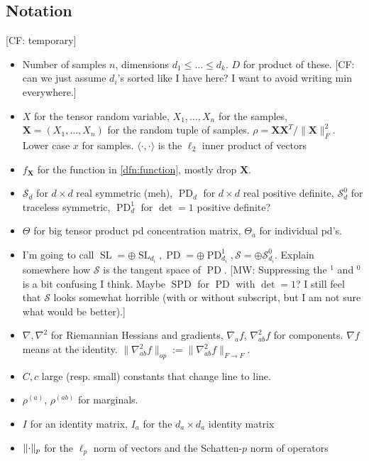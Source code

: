 \documentclass{article}
\DeclarePairedDelimiter{\norm}{\lVert}{\rVert}
\renewcommand{\vec}{\bm}
\newcommand\SL{\operatorname{SL}}
\newcommand\PD{\operatorname{PD}}
\newcommand\Sym{\mathcal{S}}
\newcommand{\CF}[1]{{\color{purple}[CF: #1]}}
\newcommand{\MW}[1]{{\color{red}[MW: #1]}}
\begin{document}
\subsection{Notation}
\CF{temporary}
\begin{itemize}
\item Number of samples $n$, dimensions $d_1\leq \dots \leq d_k$. $D$ for product of these. \CF{can we just assume $d_i$'s sorted like I have here? I want to avoid writing min everywhere.}
\item $X$ for the tensor random variable, $X_1, \dots, X_n$ for the samples, $\vec X = (X_1, \dots, X_n)$ for the random tuple of samples.
$\rho = \vec X \vec X^T/\|\vec X\|_F^2$. Lower case $x$ for samples.
$\langle \cdot, \cdot \rangle$ is the $\ell_2$ inner product of vectors
\item $f_{\vec X}$ for the function in \cref{dfn:function}, mostly drop $\vec X$.
\item $\Sym_d$ for $d \times d$ real symmetric (meh), $\PD_d$ for $d \times d$ real positive definite, $\Sym_d^0$ for traceless symmetric, $\PD_d^1$ for $\det=1$ positive definite? 
\item $\Theta$ for big tensor product pd concentration matrix, $\Theta_a$ for individual pd's.
\item I'm going to call $\SL = \oplus \SL_{d_i}, \PD = \oplus \PD_{d_i}^1, \Sym = \oplus \Sym_{d_i}^0$. Explain somewhere how $\Sym$ is the tangent space of $\PD$. \MW{Suppressing the $^1$ and $^0$ is a bit confusing I think. Maybe $\operatorname{SPD}$ for $\PD$ with $\det=1$? I still feel that $\Sym$ looks somewhat horrible (with or without subscript, but I am not sure what would be better).}

\item $\nabla, \nabla^2$ for Riemannian Hessians and gradients, $\nabla_a f$, $\nabla^2_{ab} f$ for components. $\nabla f$ means at the identity. $\|\nabla^2_{ab}f\|_{op}:=\|\nabla^2_{ab}f\|_{F\to F}$.
\item $C, c$ large (resp. small) constants that change line to line.
\item $\rho^{(a)}$, $\rho^{(ab)}$ for marginals.
\item $I$ for an identity matrix, $I_a$ for the $d_a \times d_a$ identity matrix
\item $\norm{\cdot}_p$ for the $\ell_p$ norm of vectors and the Schatten-$p$ norm of operators
\end{itemize}
\end{document}
